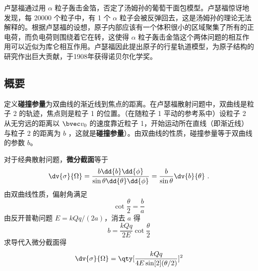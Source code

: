 
卢瑟福通过用 $\alpha$ 粒子轰击金箔，否定了汤姆孙的葡萄干面包模型。卢瑟福惊讶地发现，每 20000 个粒子中，有 1 个 $\alpha$ 粒子会被反弹回去，这是汤姆孙的理论无法解释的。根据卢瑟福的设想，原子内部应该有一个体积很小的区域聚集了所有的正电荷，而负电荷则围绕着它在转，这使得 $\alpha$ 粒子轰击金箔这个两体问题的相互作用可以近似为库仑相互作用。卢瑟福因此提出原子的行星轨道模型，为原子结构的研究作出巨大贡献，于1908年获得诺贝尔化学奖。
\subsection{概要}
定义\textbf{碰撞参量}为双曲线的渐近线到焦点的距离。在卢瑟福散射问题中，双曲线是粒子 2 的轨迹，焦点则是粒子 1 的位置。（在随粒子 1 平动的参考系中）设粒子 2 从无穷远的距离以 $\bvec v_0$ 的速度靠近粒子 1，开始运动所在直线（即渐近线）与粒子 2 的距离为 $b$ ，这就是\textbf{碰撞参量}）。由双曲线的性质，碰撞参量等于双曲线的参数 $b$。

对于经典散射问题，\textbf{微分截面}等于
\begin{equation}
\dv{\sigma}{\Omega} = \frac{b \dd{b}\dd{\phi} }{\sin \theta \dd{\theta} \dd{\phi} } = \frac{b}{\sin \theta }\dv{b}{\theta}~.
\end{equation}
由双曲线性质，偏射角满足
\begin{equation}
\cot{\frac{\theta }{2}}= \frac{b}{a}
\end{equation}
由反开普勒问题  $E = kQq/(2a)$，消去 $a$ 得
\begin{equation}
b = \frac{kQq}{2E}\cot {\frac{\theta }{2}}
\end{equation}
求导代入微分截面得
\begin{equation}\label{RuthSc_eq1}
\dv{\sigma}{\Omega} = \qty[ \frac{kQq}{4E \sin[2](\theta /2)} ]^2
\end{equation}

